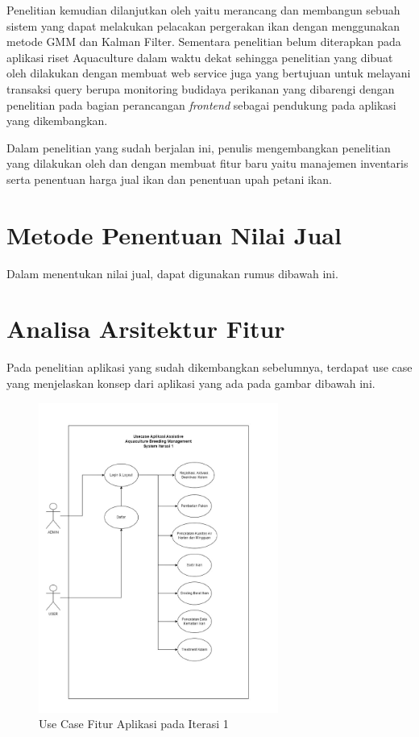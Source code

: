 Penelitian \citep{bagus2022} kemudian dilanjutkan oleh \citep{hafiz2021} yaitu merancang dan membangun sebuah sistem yang dapat melakukan pelacakan pergerakan ikan dengan menggunakan metode GMM dan Kalman Filter. Sementara penelitian \citep{fadhil2021} belum diterapkan pada aplikasi riset Aquaculture dalam waktu dekat sehingga penelitian yang dibuat oleh \citep{andri2022} dilakukan dengan membuat web service juga yang bertujuan untuk melayani transaksi query berupa monitoring budidaya perikanan yang dibarengi dengan penelitian \citep{gian2022} pada bagian perancangan \textit{frontend} sebagai pendukung pada aplikasi yang dikembangkan.

Dalam penelitian yang sudah berjalan ini, penulis mengembangkan penelitian yang dilakukan oleh \citep{andri2022} dan \citep{gian2022} dengan membuat fitur baru yaitu manajemen inventaris serta penentuan harga jual ikan dan penentuan upah petani ikan.

\section{Metode Penentuan Nilai Jual}

Dalam menentukan nilai jual, dapat digunakan rumus dibawah ini.





\section{Analisa Arsitektur Fitur}

Pada penelitian aplikasi yang sudah dikembangkan sebelumnya, terdapat use case yang menjelaskan konsep dari aplikasi yang ada pada gambar dibawah ini.

\begin{figure}[H]
	\centering
	\includegraphics[width=0.7\textwidth]{gambar/akbar/usecase_iterasi_1.jpeg}
	\caption{Use Case Fitur Aplikasi pada Iterasi 1}
\end{figure}

